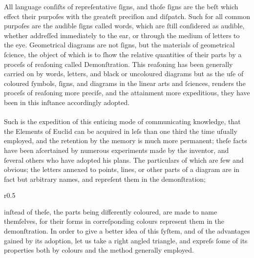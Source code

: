 All language conſiſts of repreſentative ſigns, and thoſe ſigns are the beſt which effect their purpoſes with the greateſt preciſion and diſpatch. Such for all common purpoſes are the audible ſigns called words, which are ſtill conſidered as audible, whether addreſſed immediately to the ear, or through the medium of letters to the eye. Geometrical diagrams are not ſigns, but the materials of geometrical ſcience, the object of which is to ſhow the relative quantities of their parts by a proceſs of reaſoning called Demonſtration.  This reaſoning has been generally carried on by words, letters, and black or uncoloured diagrams but as the uſe of coloured ſymbols, ſigns, and diagrams in the linear arts and ſciences, renders the proceſs of reaſoning more preciſe, and the attainment more expeditious, they have been in this inſtance accordingly adopted.\\
\hfill\\
Such is the expedition of this enticing mode of communicating knowledge, that the Elements of Euclid can be acquired in leſs than one third the time uſually employed, and the retention by the memory is much more permanent; theſe facts have been aſcertained by numerous experiments made by the inventor, and ſeveral others who have adopted his plans. The particulars of which are few and obvious; the letters annexed to points, lines, or other parts of a diagram are in fact but arbitrary names, and repreſent them in the demonſtration;
\begin{wrapfigure}{r}{0.5\textwidth}
    \centering
    
\end{wrapfigure}
inſtead of theſe, the parts being differently coloured, are made to name themſelves, for their forms in correſponding colours represent them in the demonſtration. In order to give a better idea of this ſyſtem, and of the advantages gained by its adoption, let us take a right angled triangle, and expreſs ſome of its properties both by colours and the
method generally employed.
